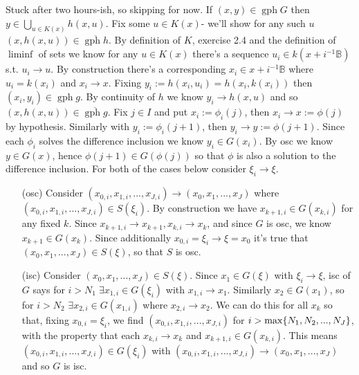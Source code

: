 \documentclass{article}
\newenvironment{ex}[1]
  {\renewcommand\theexercise{#1}\exercise}
  {\endexercise}
\newcommand{\B}{\mathbb{B}}
\DeclareMathOperator*{\gph}{gph}
\begin{document}
\begin{ex}{3.5}
  Stuck after two hours-ish, so skipping for now.
\end{ex}
\begin{ex}{3.6}
  If $(x, y) \in \gph G$ then $y \in \bigcup_{u\in K(x)} h(x, u)$. Fix some $u \in K(x)$- we'll show for any such $u$ $(x, h(x, u)) \in \overline{\gph h}$. By definition of $K$, exercise 2.4 and the definition of $\liminf$ of sets we know for any $u \in K(x)$ there's a sequence $u_i \in k(x + i^{-1}\B)$ s.t. $u_i \to u$. By construction there's a corresponding $x_i \in x + i^{-1}\B$ where $u_i = k(x_i)$ and $x_i \to x$. Fixing $y_i := h(x_i, u_i) = h(x_i, k(x_i))$ then $(x_i, y_i) \in \gph g$. By continuity of $h$ we know $y_i \to h(x, u)$ and so $(x, h(x, u)) \in \overline{\gph g}$.
\end{ex}
\begin{ex}{3.8}
  Fix $j \in I$ and put $x_i := \phi_i(j)$, then $x_i \to x := \phi(j)$ by hypothesis. Similarly with $y_i := \phi_i(j+1)$, then $y_i \to y := \phi(j+1)$. Since each $\phi_i$ solves the difference inclusion we know $y_i \in G(x_i)$. By osc we know $y \in G(x)$, hence $\phi(j+1) \in G(\phi(j))$ so that $\phi$ is also a solution to the difference inclusion.
\end{ex}
\begin{ex}{3.10}
  For both of the cases below consider $\xi_i \to \xi$.
  \begin{itemize}
    \item[(osc)]
      Consider $(x_{0,i}, x_{1, i}, ..., x_{J, i}) \to (x_0, x_1, ..., x_J)$ where $(x_{0,i}, x_{1, i}, ..., x_{J, i}) \in S(\xi_i)$. By construction we have $x_{k+1,i} \in G(x_{k, i})$ for any fixed $k$. Since $x_{k+1,i} \to x_{k+1}, x_{k, i} \to x_k$, and since $G$ is osc, we know $x_{k+1} \in G(x_k)$. Since additionally $x_{0, i} = \xi_i \to \xi = x_0$ it's true that $(x_0, x_1, ..., x_J) \in S(\xi)$, so that $S$ is osc.
    \item[(isc)]
      Consider $(x_0, x_1, ..., x_J) \in S(\xi)$. Since $x_1 \in G(\xi)$ with $\xi_i \to \xi$, isc of $G$ says for $i > N_1 \; \exists x_{1, i} \in G(\xi_i)$ with $x_{1, i} \to x_1$. Similarly $x_2 \in G(x_1)$, so for $i > N_2$ $\exists x_{2,i} \in G(x_{1, i})$ where $x_{2, i} \to x_2$. We can do this for all $x_k$ so that, fixing $x_{0, i} = \xi_i$, we find $(x_{0, i}, x_{1, i}, ..., x_{J, i})$ for $i > \max\{N_1, N_2, ..., N_J\}$, with the property that each $x_{k,i} \to x_k$ and $x_{k+1, i} \in G(x_{k,i})$. This means $(x_{0, i}, x_{1, i}, ..., x_{J, i}) \in G(\xi_i)$ with $(x_{0, i}, x_{1, i}, ..., x_{J, i}) \to (x_0, x_1, ..., x_J)$ and so $G$ is isc.
  \end{itemize}
\end{ex}
\end{document}
